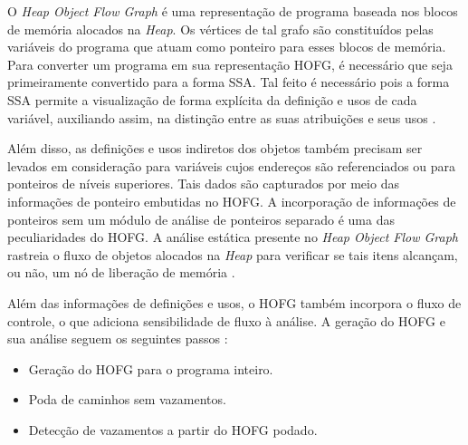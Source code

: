 \documentclass[
    12pt,                %
    openright,           %
    oneside,             %
    a4paper,             %
    english,             %
    brazil               %
]{abntex2}
\begin{document}
O \textit{Heap Object Flow Graph} é uma representação de programa baseada nos blocos de memória alocados na \textit{Heap}. Os vértices de tal grafo são constituídos pelas variáveis do programa que atuam como ponteiro para esses blocos de memória. Para converter um programa em sua representação HOFG, 
é necessário que seja primeiramente convertido para a forma SSA. Tal feito é necessário pois a forma SSA permite a visualização de forma explícita da definição e usos de cada variável, auxiliando assim, na distinção entre as suas atribuições e seus usos \cite{MadhavC2023}.
\par 
Além disso, as definições e usos indiretos dos objetos também precisam ser levados em consideração para variáveis cujos endereços são referenciados ou para ponteiros de níveis superiores. 
Tais dados são capturados por meio das informações de ponteiro embutidas no HOFG. A incorporação de informações de ponteiros sem um módulo de análise de ponteiros separado é uma das peculiaridades do HOFG. 
A análise estática presente no \textit{Heap Object Flow Graph} rastreia o fluxo de objetos alocados na \textit{Heap} para verificar se tais itens alcançam, ou não, um nó de liberação de memória \cite{MadhavC2023}.
\par
\begin{samepage}
    Além das informações de definições e usos, o HOFG também incorpora o fluxo de controle, o que adiciona sensibilidade de fluxo à análise. A geração do HOFG e sua análise seguem os seguintes passos \cite{MadhavC2023}:
    \begin{itemize}
    \item Geração do HOFG para o programa inteiro.
    \item Poda de caminhos sem vazamentos.
    \item Detecção de vazamentos a partir do HOFG podado.
    \end{itemize}
\end{samepage}
\end{document}
